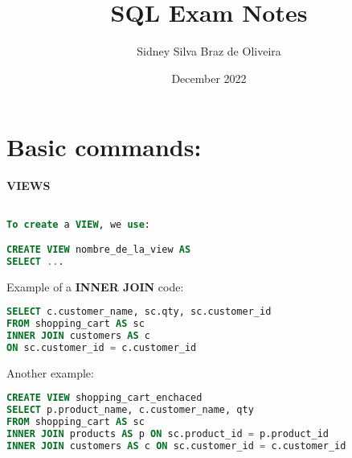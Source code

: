 \documentclass[a4paper, 12pt]{article}
\title{SQL Exam Notes}
\author{Sidney Silva Braz de Oliveira}
\date{December 2022}
\begin{document}
\maketitle

\section{Basic commands:}
\textbf{VIEWS}
\begin{lstlisting}[language=SQL]

To create a VIEW, we use:

CREATE VIEW nombre_de_la_view AS
SELECT ...

\end{lstlisting}
Example of a \textbf{INNER JOIN} code:
\begin{lstlisting}[language=SQL]
SELECT c.customer_name, sc.qty, sc.customer_id
FROM shopping_cart AS sc
INNER JOIN customers AS c
ON sc.customer_id = c.customer_id
\end{lstlisting}
Another example:
\begin{lstlisting}[language=SQL]
CREATE VIEW shopping_cart_enchaced
SELECT p.product_name, c.customer_name, qty
FROM shopping_cart AS sc
INNER JOIN products AS p ON sc.product_id = p.product_id
INNER JOIN customers AS c ON sc.customer_id = c.customer_id

\end{lstlisting}
\end{document}
